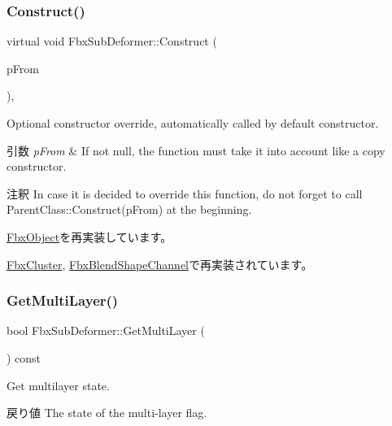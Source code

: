\subsubsection{\texorpdfstring{Construct()}{Construct()}}
{\footnotesize\ttfamily virtual void Fbx\+Sub\+Deformer\+::\+Construct (\begin{DoxyParamCaption}\item[{const \hyperlink{class_fbx_object}{Fbx\+Object} $\ast$}]{p\+From }\end{DoxyParamCaption})\hspace{0.3cm}{\ttfamily [protected]}, {\ttfamily [virtual]}}

Optional constructor override, automatically called by default constructor. 
\begin{DoxyParams}{引数}
{\em p\+From} & If not null, the function must take it into account like a copy constructor. \\
\hline
\end{DoxyParams}
\begin{DoxyRemark}{注釈}
In case it is decided to override this function, do not forget to call Parent\+Class\+::\+Construct(p\+From) at the beginning. 
\end{DoxyRemark}


\hyperlink{class_fbx_object_a313503bc645af3fdceb4a99ef5cea7eb}{Fbx\+Object}を再実装しています。



\hyperlink{class_fbx_cluster_a80619129929789d80930b2bbb524593c}{Fbx\+Cluster}, \hyperlink{class_fbx_blend_shape_channel_ad16237e4706289af6a9235b8425415cb}{Fbx\+Blend\+Shape\+Channel}で再実装されています。

\mbox{\label{class_fbx_sub_deformer_a9a430ccafe4f08c976b9963627b5de05}} 
\subsubsection{\texorpdfstring{Get\+Multi\+Layer()}{GetMultiLayer()}}
{\footnotesize\ttfamily bool Fbx\+Sub\+Deformer\+::\+Get\+Multi\+Layer (\begin{DoxyParamCaption}{ }\end{DoxyParamCaption}) const}

Get multilayer state. \begin{DoxyReturn}{戻り値}
The state of the multi-\/layer flag. 
\end{DoxyReturn}
\mbox{\label{class_fbx_sub_deformer_a1a1998b98ca03598bc6bec630e1aaa97}} 
